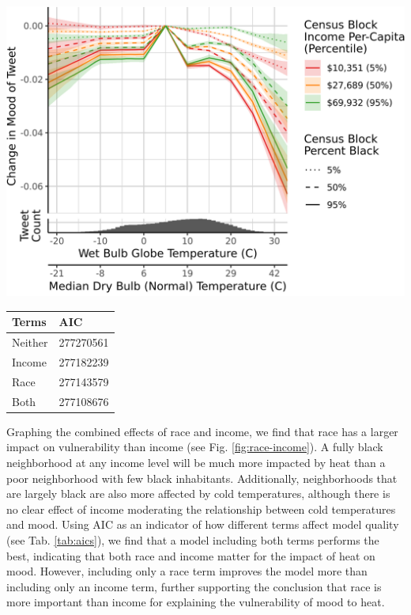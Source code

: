 \documentclass[fleqn,10pt]{wlscirep}
\begin{document}
\begin{minipage}{.65\textwidth}
\centering
\includegraphics[width=\textwidth]{../res/wbgt-income-race.png}
\label{fig:race-income}
\end{minipage}\hfill
\begin{minipage}{.35\textwidth}
\centering
\begin{tabular}{| l | l |}
\hline
Terms & AIC \\
\hline
Neither & 277270561 \\
Income & 277182239 \\
Race & 277143579 \\
Both & 277108676 \\
\hline
\end{tabular}
\label{tab:aics}
\end{minipage}

Graphing the combined effects of race and income, we find that race has a larger impact on vulnerability than income (see Fig. \ref{fig:race-income}). A fully black neighborhood at any income level will be much more impacted by heat than a poor neighborhood with few black inhabitants. Additionally, neighborhoods that are largely black are also more affected by cold temperatures, although there is no clear effect of income moderating the relationship between cold temperatures and mood. Using AIC as an indicator of how different terms affect model quality (see Tab. \ref{tab:aics}), we find that a model including both terms performs the best, indicating that both race and income matter for the impact of heat on mood. However, including only a race term improves the model more than including only an income term, further supporting the conclusion that race is more important than income for explaining the vulnerability of mood to heat.
\end{document}
